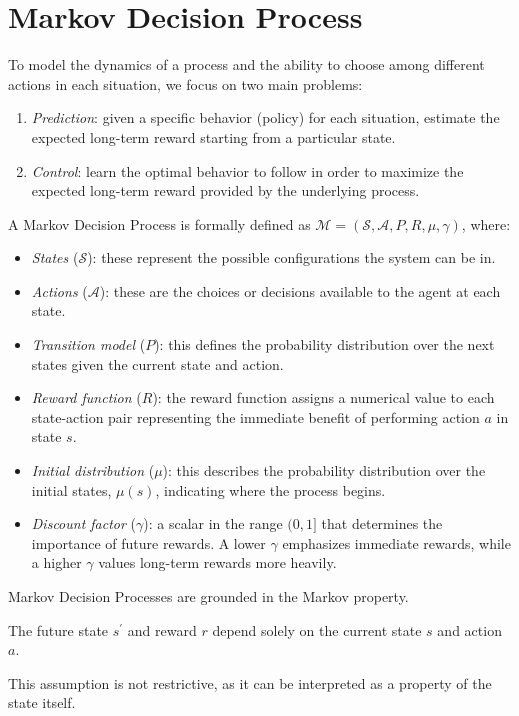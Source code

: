 \section{Markov Decision Process}

To model the dynamics of a process and the ability to choose among different actions in each situation, we focus on two main problems:
\begin{enumerate}
    \item \textit{Prediction}: given a specific behavior (policy) for each situation, estimate the expected long-term reward starting from a particular state.
    \item \textit{Control}: learn the optimal behavior to follow in order to maximize the expected long-term reward provided by the underlying process.
\end{enumerate}
A Markov Decision Process is formally defined as $\mathcal{M} = (\mathcal{S}, \mathcal{A}, P, R, \mu, \gamma)$, where:
\begin{itemize}
    \item \textit{States} ($\mathcal{S}$): these represent the possible configurations the system can be in.
    \item \textit{Actions} ($\mathcal{A}$): these are the choices or decisions available to the agent at each state.
    \item \textit{Transition model} ($P$): this defines the probability distribution over the next states given the current state and action. 
    \item \textit{Reward function} ($R$): the reward function assigns a numerical value to each state-action pair representing the immediate benefit of performing action $a$ in state $s$.
    \item \textit{Initial distribution} ($\mu$): this describes the probability distribution over the initial states, $\mu(s)$, indicating where the process begins.
    \item \textit{Discount factor} ($\gamma$): a scalar in the range $(0, 1]$ that determines the importance of future rewards. 
        A lower $\gamma$ emphasizes immediate rewards, while a higher $\gamma$ values long-term rewards more heavily.
\end{itemize}

\noindent Markov Decision Processes are grounded in the Markov property. 
\begin{property}
    The future state $s^\prime$ and reward $r$ depend solely on the current state $s$ and action $a$. 
\end{property}
This assumption is not restrictive, as it can be interpreted as a property of the state itself.

